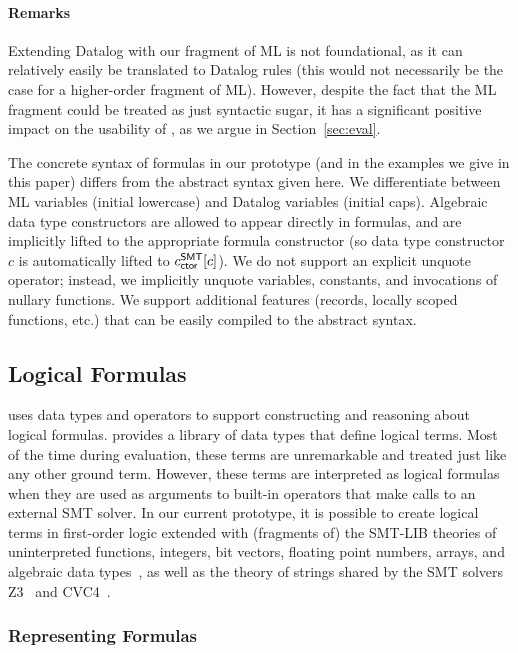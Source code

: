 \documentclass[acmsmall,screen,nonacm]{acmart}
\theoremstyle{definition}
\begin{document}
\paragraph{Remarks}
Extending Datalog with our fragment of ML is not foundational, as
it can relatively easily be translated to Datalog rules (this would not
necessarily be the case for a higher-order fragment of ML).
However, despite the fact that the ML fragment could be treated as just
syntactic sugar,
it has a significant positive impact on the usability of \Name, as we argue in
Section~\ref{sec:eval}.

The concrete syntax of formulas in our prototype (and in the examples we give
in this paper) differs from the abstract syntax given here. %
We differentiate between ML variables (initial lowercase) and Datalog variables (initial caps).
Algebraic data type constructors are allowed to appear directly in
formulas, and are implicitly lifted to the appropriate formula constructor (so
data type constructor $c$ is automatically lifted to $c^\mathsf{SMT}_{\mathsf{ctor}}[c]$).
We do not support an explicit unquote operator; instead, we implicitly
unquote variables, constants, and invocations of nullary functions. %
We support additional features (records, locally scoped functions, etc.) that
can be easily compiled to the abstract syntax.

\subsection{Logical Formulas}\label{sec:formulas}

\Name uses data types and operators to support constructing and reasoning about
logical formulas.
\Name provides a library of data types that define logical terms.
Most of the time during evaluation, these terms are unremarkable and treated
just like any other ground term.
However, these terms are interpreted as logical formulas when they are used as
arguments to built-in operators that make calls to an external SMT solver.
In our current prototype, it is possible to create logical terms in first-order
logic extended with (fragments of) the SMT-LIB theories of uninterpreted
functions, integers, bit vectors, floating point numbers, arrays, and algebraic
data types~\citep{smtlib}, as well as the theory of strings shared by the SMT
solvers Z3~\citep{z3} and CVC4~\citep{cvc4}.

\subsubsection{Representing Formulas}\label{sec:repformulas}
\end{document}
